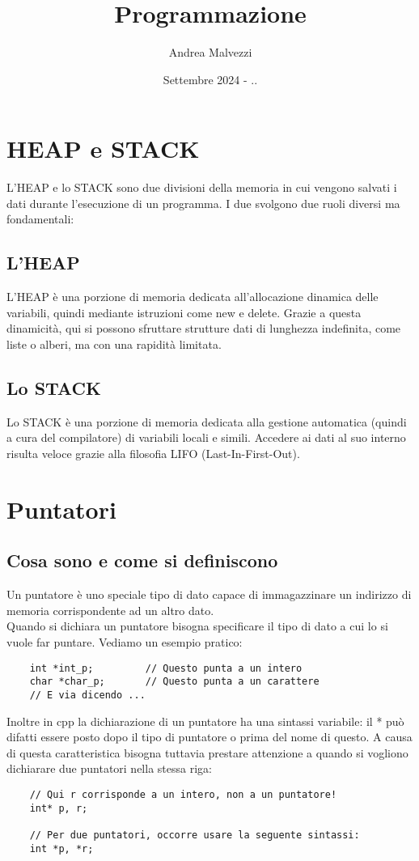 \documentclass[12pt]{article}
\title{\textbf{Programmazione}}
\date{Settembre 2024 - ..}
\author{Andrea Malvezzi}
\begin{document}
\maketitle

\pagebreak
\tableofcontents

\pagebreak
\section{HEAP e STACK}
\label{sec:HEAP_STACK}
L'HEAP e lo STACK sono due divisioni della memoria in cui vengono salvati i dati durante l'esecuzione di un programma. 
I due svolgono due ruoli diversi ma fondamentali:

\subsection{L'HEAP}
\label{ssec:HEAP}
L'HEAP è una porzione di memoria dedicata all'allocazione dinamica delle variabili, quindi mediante istruzioni come new e delete. Grazie a questa dinamicità, qui si possono sfruttare strutture dati di lunghezza indefinita, come liste o alberi, ma con una rapidità limitata.

\subsection{Lo STACK}
\label{ssec:STACK}
Lo STACK è una porzione di memoria dedicata alla gestione automatica (quindi a cura del compilatore) di variabili locali e simili. Accedere ai dati al suo interno risulta veloce grazie alla filosofia LIFO (Last-In-First-Out).

\section{Puntatori}
\label{sec:puntatori}

\subsection{Cosa sono e come si definiscono}
\label{ssec:puntatori_cosa_sono}
Un puntatore è uno speciale tipo di dato capace di immagazzinare un indirizzo di memoria corrispondente ad un altro dato. \\
Quando si dichiara un puntatore bisogna specificare il tipo di dato a cui lo si vuole far puntare. Vediamo un esempio pratico:
\begin{lstlisting}
    int *int_p;         // Questo punta a un intero
    char *char_p;       // Questo punta a un carattere
    // E via dicendo ...
\end{lstlisting}
Inoltre in cpp la dichiarazione di un puntatore ha una sintassi variabile: il * può difatti essere posto dopo il tipo di puntatore o prima del nome di questo. A causa di questa caratteristica bisogna tuttavia prestare attenzione a quando si vogliono dichiarare due puntatori nella stessa riga:
\begin{lstlisting}
    // Qui r corrisponde a un intero, non a un puntatore!
    int* p, r;

    // Per due puntatori, occorre usare la seguente sintassi:
    int *p, *r;
\end{lstlisting}
\end{document}
